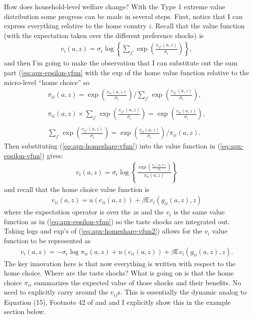 \documentclass[12pt,pdftex]{article}
\begin{document}
\begin{onehalfspacing}
How does household-level welfare change? With the Type 1 extreme value distribution some progress can be made in several steps. First, notice that I can express everything relative to the home country $i$. Recall that the value function (with the expectation taken over the different preference shocks) is
\begin{align}
v_i(a, z) =  \sigma_{\epsilon} \log \left\{ \sum_{j'} \exp \left( \frac{  v_{ij'}(a, z)}{\sigma_{\epsilon}} \right) \right\},
\label{eq:apx-epsilon-vfun}
\end{align}
and then I'm going to make the observation that I can substitute out the sum part (\ref{eq:apx-epsilon-vfun} with the exp of the home value function relative to the micro-level ``home choice'' so
\begin{align}
\pi_{ii}(a, z) = \exp \left( \frac{ v_{ii}(a, z) }{\sigma_{\epsilon}} \right) \Bigg / \sum_{j'} \exp \left( \frac{ v_{ij'}(a, z) }{\sigma_{\epsilon}} \right), \\
\nonumber \\
\pi_{ii}(a, z) \times \sum_{j'} \exp \left( \frac{ v_{ij'}(a, z) }{\sigma_{\epsilon}} \right) = \exp \left( \frac{ v_{ii}(a, z) }{\sigma_{\epsilon}} \right), \\
\nonumber \\
\sum_{j'} \exp \left( \frac{ v_{ij'}(a, z) }{\sigma_{\epsilon}} \right) = \exp \left( \frac{ v_{ii}(a, z) }{\sigma_{\epsilon}} \right) \Bigg / \pi_{ii}(a, z).
\label{eq:apx-homeshare-vfun}
\end{align}
Then substituting (\ref{eq:apx-homeshare-vfun}) into the value function in (\ref{eq:apx-epsilon-vfun}) gives:
\begin{align}
v_i(a, z) =  \sigma_{\epsilon} \log \left\{ \frac{ \exp \left( \frac{  v_{ii}(a, z)}{\sigma_{\epsilon}}\right )}{\pi_{ii}(a,z)}  \right\}
\label{eq:apx-homeshare-vfun2}
\end{align}
and recall that the home choice value function is
\begin{align}
v_{ii}(a, z) = u(c_{ii}(a,z)) + \beta \mathbb{E} v_{i}(g_{ii}(a,z),z)
\end{align}
where the expectation operator is over the $z$s and the $v_{i}$ is the same value function as in (\ref{eq:apx-epsilon-vfun}) so the taste shocks are integrated out. Taking logs and exp's of (\ref{eq:apx-homeshare-vfun2}) allows for the $v_i$ value function to be represented as
\begin{align}
v_i(a, z) = -\sigma_{\epsilon} \log \pi_{ii}(a,z) + u(c_{ii}(a,z)) + \beta \mathbb{E} v_{i}(g_{ii}(a,z),z).
\label{eq:apx-home-valuefun}
\end{align}
The key innovation here is that now everything is written with respect to the home choice. Where are the taste shocks? What is going on is that the home choice $\pi_{ii}$ summarizes the expected value of those shocks and their benefits. No need to explicitly carry around the $v_{ij}$s. This is essentially the dynamic analog to Equation (15), Footnote 42 of \citet{eaton2002technology} and \citet{arkolakis2012new} and I explicitly show this in the example section below.


\end{onehalfspacing}
\end{document}
